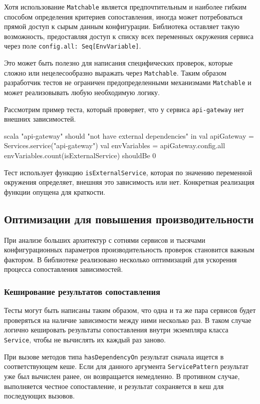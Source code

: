 Хотя использование \verb|Matchable| является предпочтительным и наиболее гибким способом определения критериев сопоставления, иногда может потребоваться прямой доступ к сырым данным конфигурации. Библиотека оставляет такую возможность, предоставляя доступ к списку всех переменных окружения сервиса через поле \verb|config.all: Seq[EnvVariable]|.

Это может быть полезно для написания специфических проверок, которые сложно или нецелесообразно выражать через \verb|Matchable|. Таким образом разработчик тестов не ограничен предопределенными механизмами \verb|Matchable| и может реализовывать любую необходимую логику.

Рассмотрим пример теста, который проверяет, что у сервиса \verb|api-gateway| нет внешних зависимостей.

\begin{code}{scala}
"api-gateway" should "not have external dependencies" in {
  val apiGateway = Services.service("api-gateway")
  val envVariables = apiGateway.config.all
  envVariables.count(isExternalService) shouldBe 0
}
\end{code}

Тест использует функцию \verb|isExternalService|, которая по значению переменной окружения определяет, внешняя это зависимость или нет. Конкретная реализация функции опущена для краткости.

\subsection{Оптимизации для повышения производительности}

При анализе больших архитектур с сотнями сервисов и тысячами конфигурационных параметров производительность проверок становится важным фактором. В библиотеке реализовано несколько оптимизаций для ускорения процесса сопоставления зависимостей.

\subsubsection{Кеширование результатов сопоставления}

Тесты могут быть написаны таким образом, что одна и та же пара сервисов будет проверяться на наличие зависимости между ними несколько раз. В таком случае логично кешировать результаты сопоставления внутри экземпляра класса \verb|Service|, чтобы не вычислять их каждый раз заново.

При вызове методов типа \verb|hasDependencyOn| результат сначала ищется в соответствующем кеше. Если для данного аргумента \verb|ServicePattern| результат уже был вычислен ранее, он возвращается немедленно. В противном случае, выполняется честное сопоставление, и результат сохраняется в кеш для последующих вызовов. 

